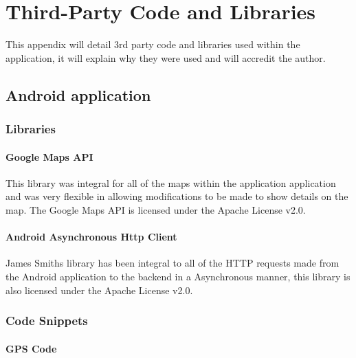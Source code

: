 \chapter{Third-Party Code and Libraries}

This appendix will detail 3rd party code and libraries used within the application, it will explain why they were used and will accredit the author.

\lstjava

\section{Android application}

\subsection{Libraries}

\subsubsection*{Google Maps API}

This library \cite{Google:MappingAPI:2015:online} was integral for all of the maps within the application application and was very flexible in allowing modifications to be made to show details on the map. The Google Maps API is licensed under the Apache License v2.0.

\subsubsection*{Android Asynchronous Http Client}

James Smiths library \cite{JamesSmith:AjaxRestLib:2015:online} has been integral to all of the HTTP requests made from the Android application to the backend in a Asynchronous manner, this library is also licensed under the Apache License v2.0.

\subsection{Code Snippets}

\subsubsection*{GPS Code}

